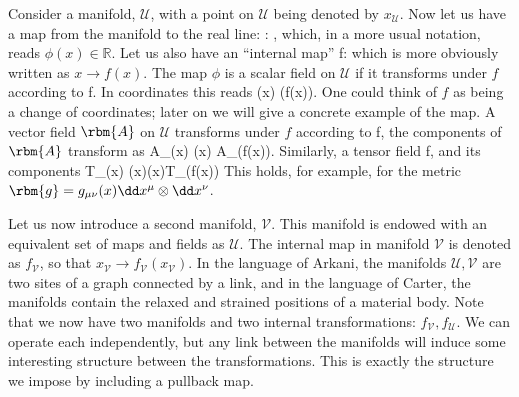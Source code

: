Consider a manifold, $\mathcal{U}$,  with a point on $\mathcal{U}$ being denoted by $x_{\mathcal{U}}$. Now let us have a map from the manifold to the real line:
\bea
\phi:  \rightarrow {},
\eea
which, in a more usual notation, reads $\phi(x) \in \mathbb{R}$.
Let us also have an ``internal map''
\bea
f: \rightarrow {}
\eea
which is more obviously written as $x\rightarrow f(x)$. The map $\phi$ is a scalar field on $\mathcal{U}$ if it transforms under $f$ according to
\bea
\phi \rightarrow \phi\circ f.
\eea
In coordinates this reads
\bea
\phi(x) \rightarrow   \phi(f(x)).
\eea
One could think of $f$ as being a change of coordinates; later on we will give a concrete example of the map. A vector field $\rbm{A}$ on $\mathcal{U}$ transforms under $f$ according to
\bea
{} \rightarrow {} \circ f,
\eea
the components of $\rbm{A}$ transform as
\bea
A_{\mu}(x) \rightarrow {}(x) A_{\alpha}(f(x)).
\eea
Similarly, a tensor field
\bea
{} \rightarrow {}\circ f,
\eea
and its components
\bea
T_{\mu\nu}(x) \rightarrow {}(x)(x)T_{\alpha\beta}(f(x))
\eea
This holds, for example, for the metric $\rbm{g} = g_{\mu\nu}(x) \dd x^{\mu}\otimes \dd x^{\nu}$.


Let us now introduce a second manifold, $\mathcal{V}$. This manifold is endowed with an equivalent set of maps and fields as $\mathcal{U}$. The internal map in manifold $\mathcal{V}$ is denoted as $f_{\mathcal{V}}$, so that $x_{\mathcal{V}} \rightarrow f_{\mathcal{V}}(x_{\mathcal{V}})$. In the language of Arkani, the manifolds $\mathcal{U,V}$ are two   sites of a graph connected by a link, and in the language of Carter, the manifolds contain the relaxed and strained positions of a material body. Note that we now have two manifolds and two internal transformations: $f_{\mathcal{V}}, f_{\mathcal{U}}$. We can operate each independently, but any link between the manifolds will induce some interesting structure between the transformations. This is exactly the structure we impose by including a pullback map.

